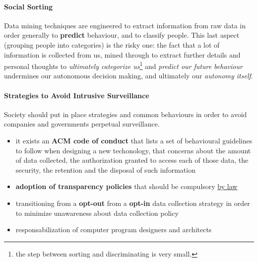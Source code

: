 \documentclass{article}
\begin{document}
				\paragraph{Social Sorting}
					Data mining techniques are engineered to extract information from raw data in order generally to \textbf{predict} behaviour, and to classify people. This last aspect (grouping people into categories) is the risky one: the fact that a lot of information is collected from us, mined through to extract further details and personal thoughts to \textit{ultimately categorize us}\footnote{the step between sorting and discriminating is very small.} and \textit{predict our future behaviour} undermines our autonomous decision making, and ultimately our \textit{autonomy itself}.
				
				\paragraph{Strategies to Avoid Intrusive Surveillance}
					Society should put in place strategies and common behaviours in order to avoid companies and governments perpetual surveillance.
					\begin{itemize}
						\item it exists an \textbf{ACM code of conduct} that lists a set of behavioural guidelines to follow when designing a new techonology, that concerns about the amount of data collected, the authorization granted to access each of those data, the security, the retention and the disposal of such information
						\item \textbf{adoption of transparency policies} that should be compulsory \underline{by law}
						\item transitioning from a \textbf{opt-out} from a \textbf{opt-in} data collection strategy in order to minimize unawareness about data collection policy
						\item responsabilization of computer program designers and architects
					\end{itemize}
		
\end{document}
